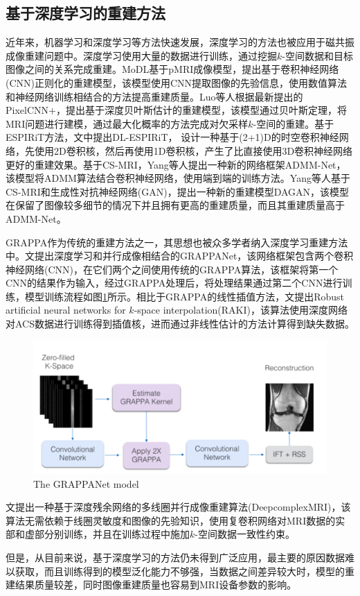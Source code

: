 \documentclass[UTF8]{article}
\begin{document}
\subsection{基于深度学习的重建方法}
\par 近年来，机器学习和深度学习等方法快速发展，深度学习的方法也被应用于磁共振成像重建问题中。深度学习使用大量的数据进行训练，通过挖掘$k$-空间数据和目标图像之间的关系完成重建。MoDL\cite{aggarwal2018modl}基于pMRI成像模型，提出基于卷积神经网络(CNN)正则化的重建模型，该模型使用CNN提取图像的先验信息，使用数值算法和神经网络训练相结合的方法提高重建质量。Luo等人根据最新提出的PixelCNN+\cite{salimans2017pixelcnn++}，提出基于深度贝叶斯估计的重建模型\cite{luo2020mri}，该模型通过贝叶斯定理，将MRI问题进行建模，通过最大化概率的方法完成对欠采样$k$-空间的重建。基于ESPIRiT方法，文\cite{sandino2021accelerating}中提出DL-ESPIRiT， 设计一种基于(2+1)D的时空卷积神经网络，先使用2D卷积核，然后再使用1D卷积核，产生了比直接使用3D卷积神经网络更好的重建效果。基于CS-MRI，Yang等人提出一种新的网络框架ADMM-Net\cite{yang2016deep}，该模型将ADMM算法结合卷积神经网络，使用端到端的训练方法。Yang等人基于CS-MRI和生成性对抗神经网络(GAN)，提出一种新的重建模型DAGAN\cite{yang2017dagan}，该模型在保留了图像较多细节的情况下并且拥有更高的重建质量，而且其重建质量高于ADMM-Net。
\par GRAPPA作为传统的重建方法之一，其思想也被众多学者纳入深度学习重建方法中。文\cite{9157643}提出深度学习和并行成像相结合的GRAPPANet，该网络框架包含两个卷积神经网络(CNN)，在它们两个之间使用传统的GRAPPA算法，该框架将第一个CNN的结果作为输入，经过GRAPPA处理后，将处理结果通过第二个CNN进行训练，模型训练流程如图\ref{GRAPPANet}所示。相比于GRAPPA的线性插值方法，文\cite{Mehmet2019Scan}提出Robust artificial neural networks for $k$-space interpolation(RAKI)，该算法使用深度网络对ACS数据进行训练得到插值核，进而通过非线性估计的方法计算得到缺失数据。
\begin{figure}[ht]
	\centering
	\includegraphics[scale=1]{./image/GRAPPANet.png}
	\caption{The GRAPPANet model}
	\label{GRAPPANet}
\end{figure}
\par 文\cite{WANG2020136}提出一种基于深度残余网络的多线圈并行成像重建算法(DeepcomplexMRI)，该算法无需依赖于线圈灵敏度和图像的先验知识，使用复卷积网络对MRI数据的实部和虚部分别训练，并且在训练过程中施加$k$-空间数据一致性约束。


\par 但是，从目前来说，基于深度学习的方法仍未得到广泛应用，最主要的原因数据难以获取，而且训练得到的模型泛化能力不够强，当数据之间差异较大时，模型的重建结果质量较差，同时图像重建质量也容易到MRI设备参数的影响。


\newpage


\end{document}
